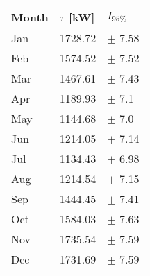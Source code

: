 \begin{tabular}{lll}
\toprule
Month & $\tau$ [kW] &   $I_{95\%}$ \\
\midrule
  Jan &     1728.72 &   $\pm$ 7.58 \\
  Feb &     1574.52 &   $\pm$ 7.52 \\
  Mar &     1467.61 &   $\pm$ 7.43 \\
  Apr &     1189.93 &    $\pm$ 7.1 \\
  May &     1144.68 &    $\pm$ 7.0 \\
  Jun &     1214.05 &   $\pm$ 7.14 \\
  Jul &     1134.43 &   $\pm$ 6.98 \\
  Aug &     1214.54 &   $\pm$ 7.15 \\
  Sep &     1444.45 &   $\pm$ 7.41 \\
  Oct &     1584.03 &   $\pm$ 7.63 \\
  Nov &     1735.54 &   $\pm$ 7.59 \\
  Dec &     1731.69 &   $\pm$ 7.59 \\
\bottomrule
\end{tabular}
